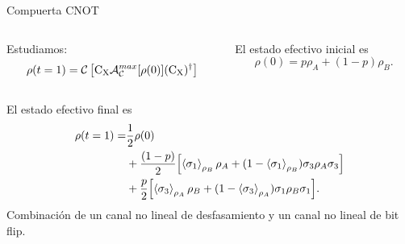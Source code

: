 \begin{frame}{Compuerta CNOT}
    \begin{columns}
        \begin{column}{0.5\textwidth}
            Estudiamos:
            \begin{equation}
                \rho(t=1)=\mathcal{C}\left[\text{C}_{\text{X}} \mathcal{A}_{\mathcal{C}}^{max}[\rho(0)](\text{C}_{\text{X}})^{\dag}\right]\nonumber
            \end{equation}
        \end{column}
        \begin{column}{0.5\textwidth}
            El estado efectivo inicial es
            \begin{equation}
                \rho(0)=p\rho_{A}+(1-p)\rho_{B}.\nonumber
            \end{equation}
        \end{column}
    \end{columns}
    El estado efectivo final es
    \begin{align*}
        \rho(t=1)=&\frac{1}{2}\rho(0)\\
        &+\frac{(1-p)}{2}\qty[\expval{\sigma_{1}}_{\rho_{B}}\rho_{A}+(1-\expval{\sigma_{1}}_{\rho_{B}})\sigma_{3}\rho_{A}\sigma_{3}]\\
        &+\frac{p}{2}\qty[\expval{\sigma_{3}}_{\rho_{A}}\rho_{B}+(1-\expval{\sigma_{3}}_{\rho_{A}})\sigma_{1}\rho_{B}\sigma_{1}].
    \end{align*}
    Combinación de un canal no lineal de desfasamiento y un canal no lineal de bit flip.
\end{frame}
